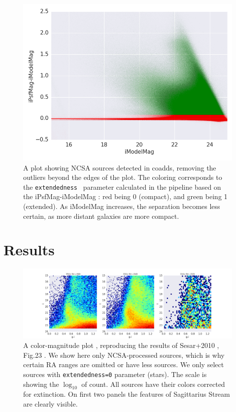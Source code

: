 \documentclass[fleqn,usenatbib]{mnras}  %
\begin{document}
\begin{figure}
\label{fig:coadds_ext}
 \includegraphics[width=\columnwidth]{Extendedness_coadd_data_16520093_srcs_lim.png}
 \cprotect\caption{A plot showing NCSA sources detected in coadds, removing the outliers beyond the edges of the plot. The coloring corresponds to the \verb|extendedness | parameter calculated in the pipeline based on the iPsfMag-iModelMag : red being 0 (compact), and green being 1 (extended). As iModelMag increases, the separation becomes less certain, as more distant galaxies are more compact.  }
\end{figure}
% 

\section{Results}
\label{sec:results}


\begin{figure}
\label{fig:colors_example}
\includegraphics[width=\textwidth]{Fig_g-i_vs_i_ra_310-360hist_n_50row_ext_0.png}
\cprotect\caption{A color-magnitude plot , reproducing the results of Sesar+2010 , Fig.23 .  We show here only NCSA-processed sources, which is why certain RA ranges are omitted or have less sources. We only select sources with \verb|extendedness=0| parameter (stars).  The scale is showing the $\log_{10}$ of count. All sources have their  colors corrected for extinction. On first two panels the features of Sagittarius Stream are clearly visible. }
\end{figure}
% 
\end{document}
